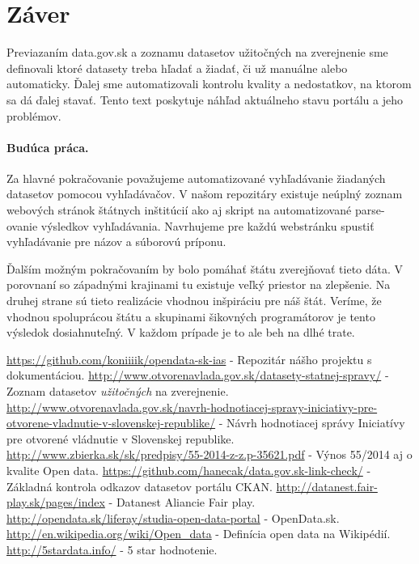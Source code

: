\documentclass[12pt,a4paper]{article}
\begin{document}
\section{Záver} 

Previazaním data.gov.sk a zoznamu datasetov užitočných na zverejnenie sme definovali ktoré datasety treba hľadať a žiadať, či už manuálne alebo automaticky. Ďalej sme automatizovali kontrolu kvality a nedostatkov, na ktorom sa dá ďalej stavať. Tento text poskytuje náhľad aktuálneho stavu portálu a jeho problémov. 

\paragraph{Budúca práca.} 
\label{future-work} 
Za hlavné pokračovanie považujeme automatizované vyhľadávanie žiadaných datasetov pomocou vyhľadávačov. V našom repozitáry existuje neúplný zoznam webových stránok štátnych inštitúcií ako aj skript na automatizované parse-ovanie výsledkov vyhľadávania. Navrhujeme pre každú webstránku spustiť vyhľadávanie pre názov a súborovú príponu. 

Ďalším možným pokračovaním by bolo pomáhať štátu zverejňovať tieto dáta. V porovnaní so západnými krajinami tu existuje veľký priestor na zlepšenie. Na druhej strane sú tieto realizácie vhodnou inšpiráciu pre náš štát. Veríme, že vhodnou spoluprácou štátu a skupinami šikovných programátorov je tento výsledok dosiahnuteľný. V každom prípade je to ale beh na dlhé trate. 

\renewcommand{\refname}{Literatúra}
{}
\begin{thebibliography}{99}
   \url{https://github.com/koniiiik/opendata-sk-ias} - Repozitár nášho projektu s dokumentáciou. 
   \url{http://www.otvorenavlada.gov.sk/datasety-statnej-spravy/} - Zoznam datasetov \emph{užitočných} na zverejnenie.
   \url{http://www.otvorenavlada.gov.sk/navrh-hodnotiacej-spravy-iniciativy-pre-otvorene-vladnutie-v-slovenskej-republike/} - Návrh hodnotiacej správy Iniciatívy pre otvorené vládnutie v Slovenskej republike.
   \url{http://www.zbierka.sk/sk/predpisy/55-2014-z-z.p-35621.pdf} - Výnos 55/2014 aj o kvalite Open data. 
   \url{https://github.com/hanecak/data.gov.sk-link-check/} - Základná kontrola odkazov datasetov portálu CKAN. 
   \url{http://datanest.fair-play.sk/pages/index} - Datanest Aliancie Fair play. 
   \url{http://opendata.sk/liferay/studia-open-data-portal} - OpenData.sk. 
   \url{http://en.wikipedia.org/wiki/Open_data} - Definícia open data na Wikipédií. 
   \url{http://5stardata.info/} - 5 star hodnotenie. 
\end{thebibliography}
\end{document}
